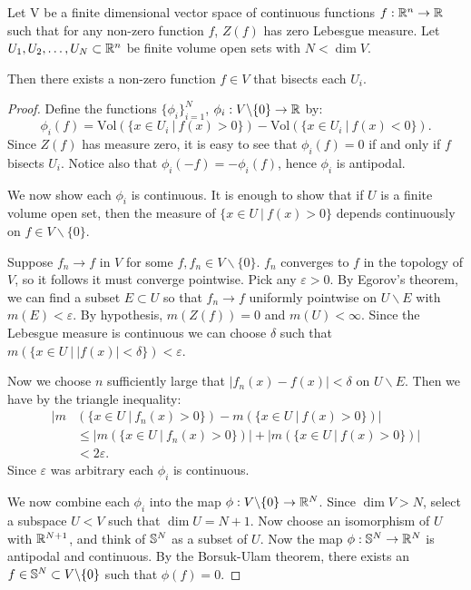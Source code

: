 \begin{theorem}
Let V be a finite dimensional vector space of continuous functions $f:\mathbb R^n \to \mathbb R$ such that for any non-zero function $f$,
 $Z(f)$ has zero Lebesgue measure. 
Let $U_1,U_2,\dots,U_N \subset \mathbb R^n$ be finite volume open sets with $N< \dim V$. 

Then there exists a non-zero function $f \in V$ that bisects each $U_i$. \label{thm:GenHamSand}
\end{theorem}
\begin{proof}

Define the functions $\{\phi_i\}_{i=1}^N$, $\phi_i: V\backslash \{0\} \to \mathbb R$ by:
\[
\phi_i(f) = \text{Vol}(\{x\in U_i \ | \ f(x) > 0 \}) - \text{Vol}(\{x\in U_i \ |\ f(x) < 0 \}).
\]
Since $Z(f)$ has measure zero, it is easy to see that $\phi_i(f) = 0$ if and only if $f$ bisects $U_i$. 
Notice also that $\phi_i(-f) = -\phi_i(f)$, hence $\phi_i$ is antipodal. 

We now show each $\phi_i$ is continuous.
It is enough to show that if $U$ is a finite volume open set, then the measure of $\{x\in U\ |\ f(x)>0\}$ depends continuously on $f\in V \backslash \{0\}$.

Suppose $f_n \to f$ in $V$ for some $f,f_n \in V \backslash \{0\}$. $f_n$ converges to $f$ in the topology of $V$, 
so it follows it must converge pointwise. Pick any $\varepsilon >0$. 
By Egorov's theorem, we can find a subset $E\subset U$ so that $f_n \to f$ uniformly pointwise on $U \backslash E$ with $m(E)< \varepsilon$.
By hypothesis, $m(Z(f)) =0$ and $m(U) < \infty$. 
Since the Lebesgue measure is continuous we can choose $\delta$ such that $m\left(\{x\in U\ \big |\ |f(x)|<\delta\}\right) < \varepsilon$.

Now we choose $n$ sufficiently large that $|f_n (x) - f(x)| < \delta$ on $U\backslash E$. Then we have by the triangle inequality:
\begin{align*}
    |m&\left(\{x\in U \ |\ f_n(x)>0\}\right) - m\left(\{x\in U\ |\ f(x)>0\}\right)| \\
    &\leq |m\left(\{x\in U\ |\ f_n(x)>0\}\right)| + |m\left(\{x\in U\ |\ f(x)>0\}\right)| \\
    &< 2 \varepsilon.
\end{align*}
Since $\varepsilon$ was arbitrary each $\phi_i$ is continuous.

We now combine each $\phi_i$ into the map $\phi : V\backslash \{0\} \to \mathbb R^N$. Since $\dim V > N$, select a subspace $U < V$ such that $\dim U = N+1$. 
Now choose an isomorphism of $U$ with $\mathbb R^{N+1}$, and think of $\mathbb S^N$ as a subset of $U$.
Now the map $\phi: \mathbb S^N \to \mathbb R^N$ is antipodal and continuous. 
By the Borsuk-Ulam theorem, there exists an $f\in \mathbb S^N \subset V\backslash \{0\}$ such that $\phi(f) = 0$.
\end{proof}

